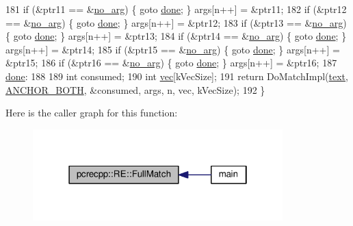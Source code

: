 \begin{DoxyCode}
181   \textcolor{keywordflow}{if} (&ptr11 == &\hyperlink{classpcrecpp_1_1RE_a596c7c964ad0e41415540e12ee73d302}{no\_arg}) \{ \textcolor{keywordflow}{goto} \hyperlink{README_8txt_aab36b2734b1c834ca42fc771a40b98ef}{done}; \} args[n++] = &ptr11;
182   \textcolor{keywordflow}{if} (&ptr12 == &\hyperlink{classpcrecpp_1_1RE_a596c7c964ad0e41415540e12ee73d302}{no\_arg}) \{ \textcolor{keywordflow}{goto} \hyperlink{README_8txt_aab36b2734b1c834ca42fc771a40b98ef}{done}; \} args[n++] = &ptr12;
183   \textcolor{keywordflow}{if} (&ptr13 == &\hyperlink{classpcrecpp_1_1RE_a596c7c964ad0e41415540e12ee73d302}{no\_arg}) \{ \textcolor{keywordflow}{goto} \hyperlink{README_8txt_aab36b2734b1c834ca42fc771a40b98ef}{done}; \} args[n++] = &ptr13;
184   \textcolor{keywordflow}{if} (&ptr14 == &\hyperlink{classpcrecpp_1_1RE_a596c7c964ad0e41415540e12ee73d302}{no\_arg}) \{ \textcolor{keywordflow}{goto} \hyperlink{README_8txt_aab36b2734b1c834ca42fc771a40b98ef}{done}; \} args[n++] = &ptr14;
185   \textcolor{keywordflow}{if} (&ptr15 == &\hyperlink{classpcrecpp_1_1RE_a596c7c964ad0e41415540e12ee73d302}{no\_arg}) \{ \textcolor{keywordflow}{goto} \hyperlink{README_8txt_aab36b2734b1c834ca42fc771a40b98ef}{done}; \} args[n++] = &ptr15;
186   \textcolor{keywordflow}{if} (&ptr16 == &\hyperlink{classpcrecpp_1_1RE_a596c7c964ad0e41415540e12ee73d302}{no\_arg}) \{ \textcolor{keywordflow}{goto} \hyperlink{README_8txt_aab36b2734b1c834ca42fc771a40b98ef}{done}; \} args[n++] = &ptr16;
187  \hyperlink{README_8txt_aab36b2734b1c834ca42fc771a40b98ef}{done}:
188 
189   \textcolor{keywordtype}{int} consumed;
190   \textcolor{keywordtype}{int} \hyperlink{group__apr__file__io_ga026ee9293cfdb03a3944adbd192f1ead}{vec}[kVecSize];
191   \textcolor{keywordflow}{return} DoMatchImpl(\hyperlink{group__APR__Util__XML_ga6f353ddc97cf6dc93417f58016afe82c}{text}, \hyperlink{classpcrecpp_1_1RE_aafe8a162d00ec7a7d6d2ba67652735efaa7140045b2005adcb6de536923377341}{ANCHOR\_BOTH}, &consumed, args, n, vec, kVecSize);
192 \}
\end{DoxyCode}


Here is the caller graph for this function\+:
\nopagebreak
\begin{figure}[H]
\begin{center}
\leavevmode
\includegraphics[width=274pt]{classpcrecpp_1_1RE_ab2fa85352750eab2f9ac20f193cd30d5_icgraph}
\end{center}
\end{figure}


